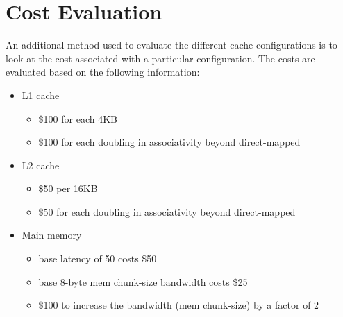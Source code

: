 \documentclass[11pt,titlepage]{article}
\begin{document}
\section{Cost Evaluation}
    An additional method used to evaluate the different cache configurations is to look at the cost associated with a particular configuration. The costs are evaluated based on the following information:
    \begin{itemize}
        \item L1 cache
            \begin{itemize}
                \item \$100 for each 4KB
                \item \$100 for each doubling in associativity beyond direct-mapped
            \end{itemize}
        \item L2 cache
            \begin{itemize}
                \item \$50 per 16KB
                \item \$50 for each doubling in associativity beyond direct-mapped
            \end{itemize}
        \item Main memory
            \begin{itemize}
                \item base latency of 50 costs \$50
                \item base 8-byte mem chunk-size bandwidth costs \$25
                \item \$100 to increase the bandwidth (mem chunk-size) by a factor of 2
            \end{itemize}
    \end{itemize}
\end{document}
